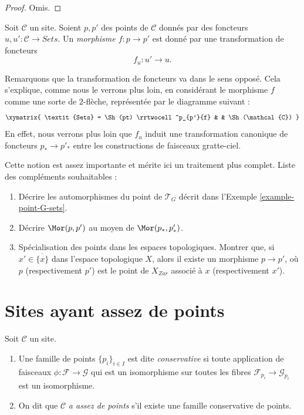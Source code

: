 \begin{proof}
Omis.
\end{proof}

\begin{definition}
\label{definition-morphism-points}
Soit $\mathcal{C}$ un site. Soient $p, p'$ des points de $\mathcal{C}$
donnés par des foncteurs $u, u' : \mathcal{C} \to \textit{Sets}$.
Un {\it morphisme $f : p \to p'$} est donné par une transformation de
foncteurs
$$
f_u : u' \to u.
$$
\end{definition}

\noindent
Remarquons que la transformation de foncteurs va dans le sens opposé.
Cela s’explique, comme nous le verrons plus loin, en considérant
le morphisme $f$ comme une sorte de $2$-flèche, représentée par le diagramme
suivant :
$$
\xymatrix{
\textit{Sets}
=
\Sh(pt)
\rrtwocell^p_{p'}{f}
&
&
\Sh(\mathcal{C})
}
$$
En effet, nous verrons plus loin que $f_u$ induit une transformation
canonique de foncteurs $p_* \to p'_*$ entre les
constructions de faisceaux gratte-ciel.

\medskip\noindent
Cette notion est assez importante et mérite ici un traitement plus complet.
Liste des compléments souhaitables :
\begin{enumerate}
\item Décrire les automorphismes du point de $\mathcal{T}_G$
décrit dans l’Exemple \ref{example-point-G-sets}.
\item Décrire $\Mor(p, p')$ au moyen de $\Mor(p_*, p'_*)$.
\item Spécialisation des points dans les espaces topologiques.
Montrer que, si $x' \in \overline{\{x\}}$ dans l’espace topologique
$X$, alors il existe un morphisme $p \to p'$, où $p$ (respectivement $p'$)
est le point de $X_{Zar}$ associé à $x$ (respectivement $x'$).
\end{enumerate}




\section{Sites ayant assez de points}
\label{section-sites-enough-points}

\begin{definition}
\label{definition-enough-points}
Soit $\mathcal{C}$ un site.
\begin{enumerate}
\item Une famille de points $\{p_i\}_{i\in I}$ est dite {\it conservative}
si toute application de faisceaux $\phi : \mathcal{F} \to \mathcal{G}$
qui est un isomorphisme sur toutes les fibres $\mathcal{F}_{p_i}
\to \mathcal{G}_{p_i}$ est un isomorphisme.
\item On dit que $\mathcal{C}$ {\it a assez de points}
s’il existe une famille conservative de points.
\end{enumerate}
\end{definition}


